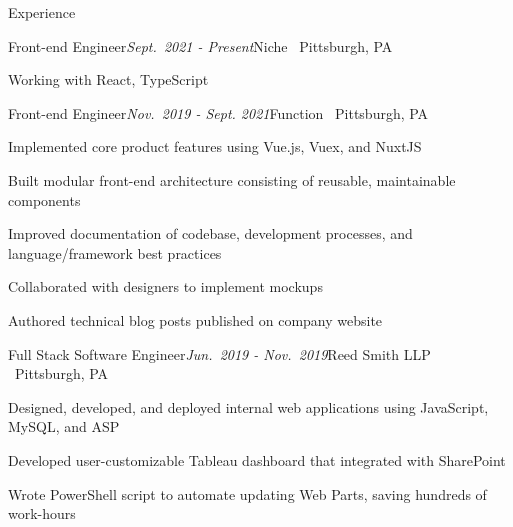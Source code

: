 \documentclass{resume} %
\begin{document}

\begin{rSection}{Experience}
\begin{rSubsection}{Front-end Engineer}{\em Sept.\ 2021 - Present}{Niche \textbar \ Pittsburgh, PA}{}
\item Working with React, TypeScript
\end{rSubsection}


\begin{rSubsection}{Front-end Engineer}{\em Nov.\ 2019 - Sept. 2021}{Function \textbar \ Pittsburgh, PA}{}
\item Implemented core product features using Vue.js, Vuex, and NuxtJS
\item Built modular front-end architecture consisting of reusable, maintainable components
\item Improved documentation of codebase, development processes, and language/framework best practices
\item Collaborated with designers to implement mockups
\item Authored technical blog posts published on company website
\end{rSubsection}


\begin{rSubsection}{Full Stack Software Engineer}{\em Jun.\ 2019 - Nov.\ 2019}{Reed Smith LLP \textbar \ Pittsburgh, PA}{}
\item Designed, developed, and deployed internal web applications using JavaScript, MySQL, and ASP
\item Developed user-customizable Tableau dashboard that integrated with SharePoint
\item Wrote PowerShell script to automate updating Web Parts, saving hundreds of work-hours
\end{rSubsection}




\end{rSection}
\end{document}

